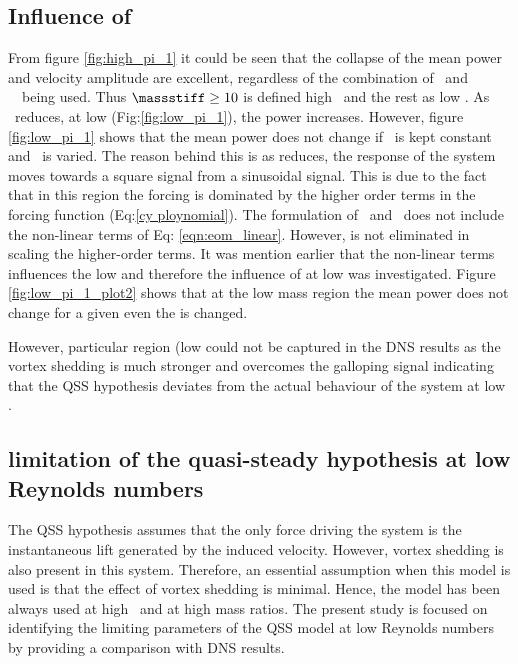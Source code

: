  \subsection{Influence of \ \massstiff}
 
 
 
 
 
 
  From figure \ref{fig:high_pi_1} it could be seen that the collapse of the mean power and velocity amplitude are excellent, regardless of the combination of \ustar \ and \ \mstar \ being used. Thus $\massstiff \geq 10$  is defined high \massstiff \ and the rest as low \massstiff. As \massstiff \ reduces, at low \massstiff (Fig:\ref{fig:low_pi_1}), the power increases. However, figure \ref{fig:low_pi_1} shows that the mean power does not change if \massstiff \ is kept constant and \mstar \ is varied. The reason behind this is as \massstiff reduces, the response of the system moves towards a square signal from a sinusoidal signal. This is due to the fact that in this region the forcing is dominated by the higher order terms in the forcing function (Eq:\ref{cy ploynomial}).  The formulation of \massstiff \ and \massdamp \ does not include the non-linear terms of Eq: \ref{eqn:eom_linear}. However,  \mstar is not eliminated in scaling the higher-order terms. It was mention earlier that the non-linear terms influences the low \massstiff and therefore the influence of \mstar at low \massstiff was investigated.  Figure \ref{fig:low_pi_1_plot2} shows that at the low mass \massstiff region the mean power does not change for a given \massstiff even the \mstar is changed. 
  
  However, particular region (low \massstiff\) could not be captured in the DNS results as the vortex shedding is much stronger and overcomes the galloping signal indicating that the QSS hypothesis deviates from the actual behaviour of the system at low \massstiff.
  
  
 
 
\subsection{limitation of the quasi-steady hypothesis at low Reynolds numbers}



The QSS hypothesis assumes that the only force driving the system is the instantaneous lift generated by the induced velocity. However, vortex shedding is also present in this system. Therefore, an essential assumption when this model is used is that the effect of vortex shedding is minimal. Hence, the model has been always used at high \reynoldsnumber \ and  at high mass ratios. The present study is focused on identifying the limiting parameters of the QSS model at low Reynolds numbers by providing a comparison with DNS results. 

